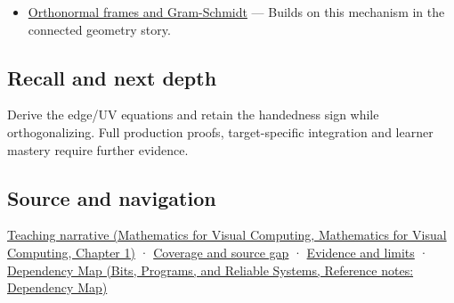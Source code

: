 \begin{itemize}
\tightlist
\item
  \hyperref[appendix-c39f1ed34271]{Orthonormal frames and Gram-Schmidt} --- Builds on this mechanism in the connected geometry story.
\end{itemize}

\subsection{Recall and next depth}\label{appendix-e31893dec985-recall-and-next-depth}

Derive the edge/UV equations and retain the handedness sign while orthogonalizing. Full production proofs, target-specific integration and learner mastery require further evidence.

\subsection{Source and navigation}\label{appendix-e31893dec985-source-and-navigation}

\href{../02-Mathematics-for-Visual-Computing/main.pdf\#nameddest=01-foundations-i-ch017-surface-movement-becomes-a-local-frame}{Teaching narrative (Mathematics for Visual Computing, Mathematics for Visual Computing, Chapter 1)} · \hyperref[appendix-fd090d982a15-phase-6---parts-501-600]{Coverage and source gap} · \hyperref[appendix-a103e7846d21-phase-6---source-analysis-and-verification]{Evidence and limits} · \href{../01-Bits-Programs-and-Reliable-Systems/main.pdf\#nameddest=appendix-4ad47bdd269a}{Dependency Map (Bits, Programs, and Reliable Systems, Reference notes: Dependency Map)}
